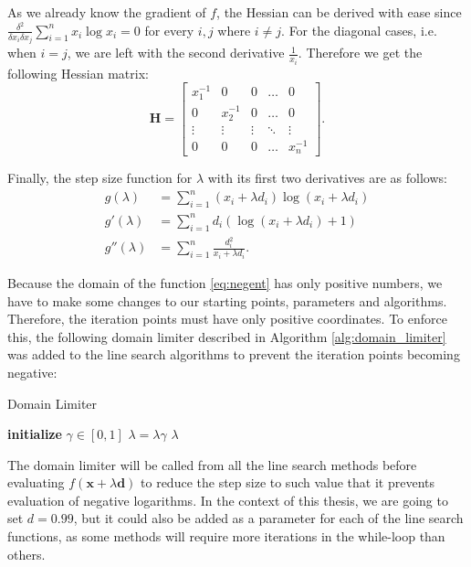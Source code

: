 \documentclass[a4paper,english,titlepage,12pt]{article}
\newcommand{\vect}[1]{\ensuremath{\mathbf{#1}}}
\begin{document}
As we already know the gradient of $f$, the Hessian can be derived with ease since $\frac{\delta^2}{\delta x_i \delta x_j} \sum_{i=1}^{n} x_i \log x_i = 0$ for every $i, j$ where $i \neq j$. For the diagonal cases, i.e. when $i = j$, we are left with the second derivative $\frac{1}{x_i}$. Therefore we get the following Hessian matrix:
\begin{equation}
    \textbf{H} =
    \begin{bmatrix}
    x_1^{-1} & 0        & 0      & \dots  & 0      \\
    0        & x_2^{-1} & 0      & \dots  & 0      \\
    \vdots   & \vdots   & \vdots & \ddots & \vdots \\
    0        & 0        & 0      & \dots  & x_n^{-1}
\end{bmatrix}.
\end{equation}

Finally, the step size function for $\lambda$ with its first two derivatives are as follows:
\begin{align}
    g(\lambda) &= \sum_{i=1}^{n} (x_i + \lambda d_i) \log (x_i + \lambda d_i) \\
    g'(\lambda) &= \sum_{i=1}^{n} d_i (\log(x_i + \lambda d_i) + 1) \\
    g''(\lambda) &= \sum_{i=1}^{n} \frac{d_i^2}{x_i + \lambda d_i}.
\end{align}

Because the domain of the function \eqref{eq:negent}  has only positive numbers, we have to make some changes to our starting points, parameters and algorithms. Therefore, the iteration points must have only positive coordinates. To enforce this, the following domain limiter described in Algorithm \ref{alg:domain_limiter} was added to the line search algorithms to prevent the iteration points becoming negative:

\begin{algorithm}[H]
\caption{Domain Limiter}
\label{alg:domain_limiter}
\begin{algorithmic}[1]
\STATE \textbf{initialize} $\gamma \in [0, 1]$
\WHILE{min $(\vect{x} + \lambda \vect{d}) \leq 0$}
    \STATE $\lambda = \lambda \gamma$
\ENDWHILE
\RETURN $\lambda$
\end{algorithmic}
\end{algorithm}

The domain limiter will be called from all the line search methods before evaluating $f(\vect{x} + \lambda\vect{d})$ to reduce the step size to such value that it prevents evaluation of negative logarithms. In the context of this thesis, we are going to set $d = 0.99$, but it could also be added as a parameter for each of the line search functions, as some methods will require more iterations in the while-loop
than others.
\end{document}
